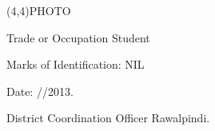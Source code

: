 \documentclass{article}
\begin{document}
\vspace{0.5cm}
\begin{center}
\framebox(4,4){PHOTO}
\end{center}

Trade or Occupation \underline{\hspace{8cm}} Student

Marks of Identification: \underline{\hspace{8cm}} NIL

\vspace{0.5cm}

Date: \underline{\hspace{2cm}}/\underline{\hspace{2cm}}/2013.

\vspace{0.5cm}

District Coordination Officer
Rawalpindi.
\end{document}
